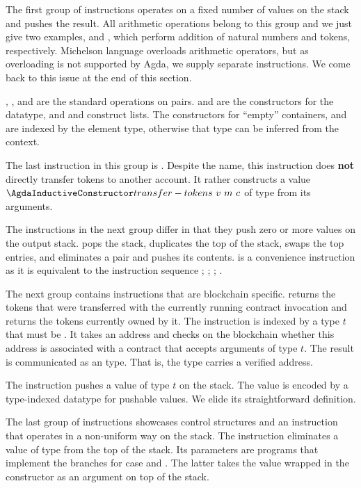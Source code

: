 The first group of instructions operates on a fixed number of values on
the stack and pushes the result. All arithmetic operations belong to
this group and we just give two examples, {\AADDnn}  and {\AADDm},
which perform addition of natural numbers and tokens, respectively.
Michelson language overloads arithmetic operators, but as
overloading is not supported by Agda, we supply separate
instructions. We come back to this issue at the end of this section. 

, , and  are the standard operations on
pairs.  and  are the constructors for the
 datatype, and  and  construct
lists. The constructors for ``empty'' containers,  and
 are indexed by the element type, otherwise that type can be
inferred from the context.

The last instruction in this group is . Despite
the name, this instruction does \textbf{not} directly transfer tokens
to another account. It rather constructs a value
{$\AtransferTokens~v~m~c$} of type {\Aoperation} from its arguments.

The instructions in the next group differ in that they push zero or more
values on the output stack.  pops the stack,  duplicates the top of the
stack,  swaps the top entries, and  eliminates
a pair and pushes its contents.  is a convenience
instruction as it is equivalent to the instruction sequence
; ; ; . 

The next group contains instructions that are blockchain
specific.  returns the tokens that were transferred with
the currently running contract invocation and   returns
the tokens currently owned by it. The  instruction is
indexed by a type $t$ that must be {\APassable}. It takes an address
and checks on the blockchain whether this address is associated with a
contract that accepts arguments of type $t$. The result is
communicated as an  type. That is, the {\Acontract} type
carries a verified address.

The  instruction pushes a value of type $t$ on the stack. The
value is encoded by a type-indexed datatype  for
pushable values. We elide its straightforward definition.

The last group of instructions showcases control structures and an
instruction that operates in a non-uniform way on the stack. The
instruction  eliminates a value of  type from the
top of the stack. Its parameters are programs that implement the branches for case 
and . The latter takes the value wrapped in the 
constructor as an argument on top of the stack.

